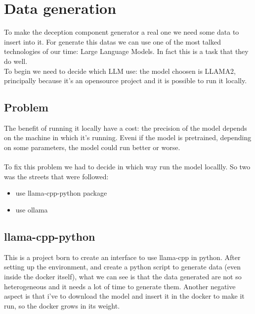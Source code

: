 \chapter{Data generation}
To make the deception component generator a real one we need some data to insert into it.
For generate this datas we can use one of the most talked technologies of our time: Large Language Models. In fact this is a task that they do well.
\\
To begin we need to decide which LLM use: the model choosen is LLAMA2, principally because it's an opensource project and it is possible to run it locally.
\section{Problem}
The benefit of running it locally have a cost: the precision of the model depends on the machine in which it's running. Eveni if the model is pretrained, depending on some parameters, the model could run better or worse.
\\\\
To fix this problem we had to decide in which way run the model locallly. So two was the streets that were followed:
\begin{itemize}
    \item use llama-cpp-python package
    \item use ollama
\end{itemize}
\section{llama-cpp-python}
This is a project born to create an interface to use llama-cpp in python.
After setting up the environment, and create a python script to generate data (even inside the docker itself), what we can see is that the data generated are not so heterogeneous and it needs a lot of time to generate them. Another negative aspect is that i've to download the model and insert it in the docker to make it run, so the docker grows in its weight.
